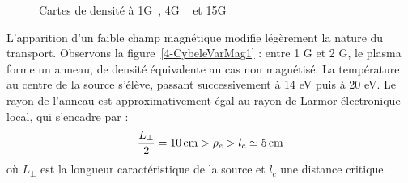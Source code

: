\begin{refsection}
\begin{figure}[!htbp]
  \centering
    \caption{Cartes de densité à 1G~, 4G
    ~ et 15G }
    \label{4-CybeleVarMag-1}
\end{figure}

L'apparition d'un faible champ magnétique modifie légèrement la nature du
transport. Observons la figure~\ref{4-CybeleVarMag1} : entre 1 G et 2 G, le
plasma forme un anneau, de densité équivalente au cas non
magnétisé. La température au centre de la source s'élève, passant 
successivement à 14 eV puis à 20 eV. Le rayon de l'anneau est approximativement
égal au rayon de Larmor électronique local, qui s'encadre par :
\begin{equation}
\frac{L_\perp}{2}=10\,\text{cm}>\rho{_{e}}>l_c\simeq 5\,\text{cm}
\end{equation}
où $L_\perp$ est la longueur caractéristique de la source et $l_c$ une distance
critique. 


\end{refsection}
